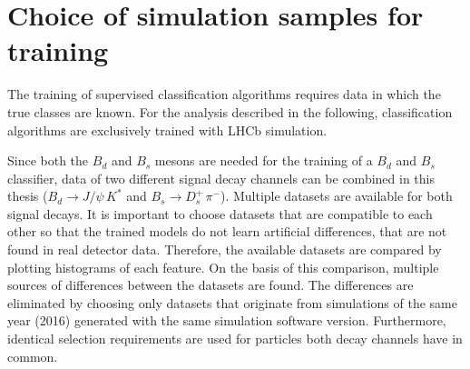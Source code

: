 \section{Choice of simulation samples for training}

The training of supervised classification algorithms requires data in which the true classes are known.
For the analysis described in the following, classification algorithms are exclusively trained with LHCb simulation.

Since both the $B_d$ and $B_s$ mesons are needed for the training of a $B_d$ and $B_s$ classifier, data of two different signal decay channels can be combined in this thesis ($B_d \rightarrow J/\psi \, K^*$ and $B_s \rightarrow D^+_s \, \pi^-$). 
Multiple datasets are available for both signal decays.
It is important to choose datasets that are compatible to each other so that the trained models do not learn artificial differences, that are not found in real detector data.
Therefore, the available datasets are compared by plotting histograms of each feature.
On the basis of this comparison, multiple sources of differences between the datasets are found.
The differences are eliminated by choosing only datasets that originate from simulations of the same year (2016) generated with the same simulation software version. 
Furthermore, identical selection requirements are used for particles both decay channels have in common.




